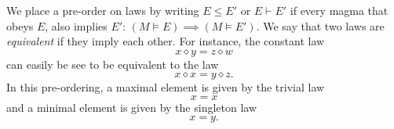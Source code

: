 \documentclass[12pt]{article}
\theoremstyle{definition}
\newcommand{\op}{\diamond}
\begin{document}
We place a pre-order on laws by writing $E \leq E'$ or $E \vdash E'$ if every magma that obeys $E$, also implies $E'$: $(M \models E) \implies (M \models E')$.  We say that two laws are \emph{equivalent} if they imply each other.  For instance, the constant law
\begin{equation}\label{eq46}\tag{E46}
x \op y = z \op w
\end{equation}
can easily be see to be equivalent to the law
\begin{equation}\label{eq41}\tag{E41}
x \op x = y \op z.
\end{equation}
In this pre-ordering, a maximal element is given by the trivial law
\begin{equation}\label{eq1}\tag{E1}
x = x
\end{equation}
and a minimal element is given by the singleton law
\begin{equation}\label{eq2}\tag{E2}
x = y.
\end{equation}
\end{document}
